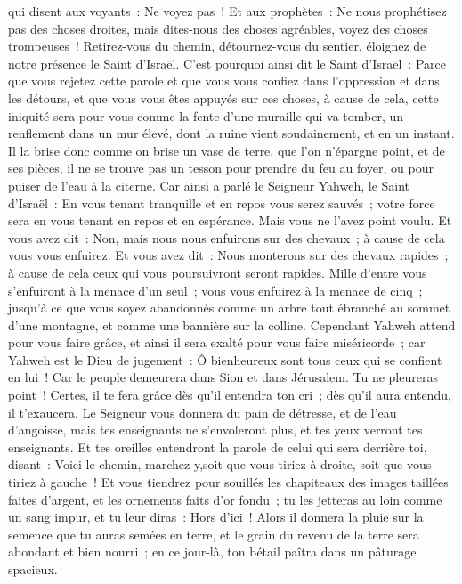 \begin{multicols}{2}
qui disent aux voyants~: Ne voyez pas~! Et aux prophètes~: Ne nous prophétisez pas des choses droites, mais dites-nous des choses agréables, voyez des choses trompeuses~!
Retirez-vous du chemin, détournez-vous du sentier, éloignez de notre présence le Saint d'Israël.
C'est pourquoi ainsi dit le Saint d'Israël~: Parce que vous rejetez cette parole et que vous vous confiez dans l'oppression et dans les détours, et que vous vous êtes appuyés sur ces choses,
à cause de cela, cette iniquité sera pour vous comme la fente d'une muraille qui va tomber, un renflement dans un mur élevé, dont la ruine vient soudainement, et en un instant.
Il la brise donc comme on brise un vase de terre, que l'on n'épargne point, et de ses pièces, il ne se trouve pas un tesson pour prendre du feu au foyer, ou pour puiser de l'eau à la citerne.
Car ainsi a parlé le Seigneur Yahweh, le Saint d'Israël~: En vous tenant tranquille et en repos vous serez sauvés~; votre force sera en vous tenant en repos et en espérance. Mais vous ne l'avez point voulu.
Et vous avez dit~: Non, mais nous nous enfuirons sur des chevaux~; à cause de cela vous vous enfuirez. Et vous avez dit~: Nous monterons sur des chevaux rapides~; à cause de cela ceux qui vous poursuivront seront rapides.
Mille d'entre vous s'enfuiront à la menace d'un seul~; vous vous enfuirez à la menace de cinq~; jusqu'à ce que vous soyez abandonnés comme un arbre tout ébranché au sommet d'une montagne, et comme une bannière sur la colline.
Cependant Yahweh attend pour vous faire grâce, et ainsi il sera exalté pour vous faire miséricorde~; car Yahweh est le Dieu de jugement~: Ô bienheureux sont tous ceux qui se confient en lui~!
Car le peuple demeurera dans Sion et dans Jérusalem. Tu ne pleureras point~! Certes, il te fera grâce dès qu'il entendra ton cri~; dès qu'il aura entendu, il t'exaucera.
Le Seigneur vous donnera du pain de détresse, et de l'eau d'angoisse, mais tes enseignants ne s'envoleront plus, et tes yeux verront tes enseignants.
Et tes oreilles entendront la parole de celui qui sera derrière toi, disant~: Voici le chemin, marchez-y,soit que vous tiriez à droite, soit que vous tiriez à gauche~!
Et vous tiendrez pour souillés les chapiteaux des images taillées faites d'argent, et les ornements faits d'or fondu~; tu les jetteras au loin comme un sang impur, et tu leur diras~: Hors d'ici~! 
Alors il donnera la pluie sur la semence que tu auras semées en terre, et le grain du revenu de la terre sera abondant et bien nourri~; en ce jour-là, ton bétail paîtra dans un pâturage spacieux.

\end{multicols}
